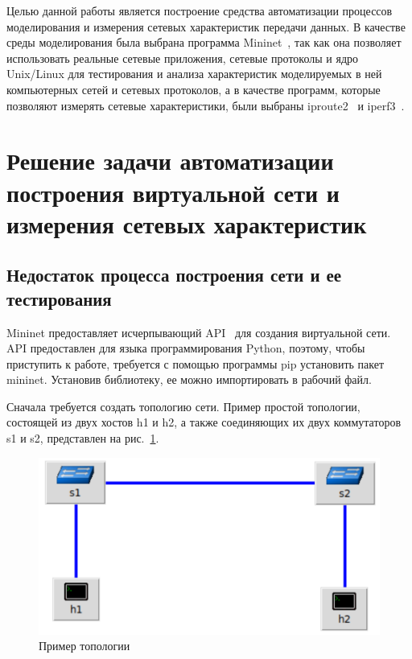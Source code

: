 \documentclass[60x84/16,8pt]{ittmm}
\begin{document}
Целью данной работы является построение средства автоматизации
процессов моделирования и измерения сетевых характеристик передачи
данных. В качестве среды моделирования была выбрана программа
Mininet~\cite{mininet}, так как она позволяет использовать реальные
сетевые приложения, сетевые протоколы и ядро Unix/Linux для
тестирования и анализа характеристик моделируемых в ней компьютерных
сетей и сетевых протоколов, а в качестве программ, которые позволяют
измерять сетевые характеристики, были выбраны iproute2~\cite{iproute2}
и iperf3~\cite{iperf3}.

\section{Решение задачи автоматизации построения виртуальной сети и измерения сетевых характеристик} 
\label{sec:base-section}

\subsection{Недостаток процесса построения сети и ее тестирования}

Mininet предоставляет исчерпывающий API~\cite{mininet-api} для
создания виртуальной сети. API предоставлен для языка программирования
Python, поэтому, чтобы приступить к работе, требуется с помощью
программы pip установить пакет mininet. Установив библиотеку, ее можно
импортировать в рабочий файл.

Сначала требуется создать топологию сети. Пример простой топологии,
состоящей из двух хостов h1 и h2, а также соединяющих их двух
коммутаторов s1 и s2, представлен на рис.~\ref{fig:example_topo}.

\begin{figure}[!h]
        \centering
        \includegraphics[width=0.5\linewidth]{example_topo2}
        \caption{Пример топологии}
        \label{fig:example_topo}
\end{figure}
\end{document}
